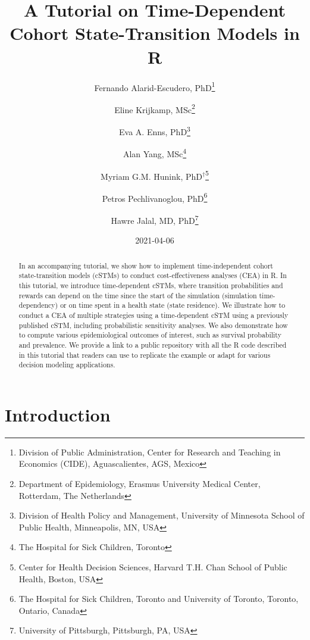 \documentclass[
]{article}
\title{A Tutorial on Time-Dependent Cohort State-Transition Models in R}
\author{Fernando Alarid-Escudero, PhD\footnote{Division of Public Administration, Center for Research and Teaching in Economics (CIDE), Aguascalientes, AGS, Mexico} \and Eline Krijkamp, MSc\footnote{Department of Epidemiology, Erasmus University Medical Center, Rotterdam, The Netherlands} \and Eva A. Enns, PhD\footnote{Division of Health Policy and Management, University of Minnesota School of Public Health, Minneapolis, MN, USA} \and Alan Yang, MSc\footnote{The Hospital for Sick Children, Toronto} \and Myriam G.M. Hunink, PhD\(^\dagger\)\footnote{Center for Health Decision Sciences, Harvard T.H. Chan School of Public Health, Boston, USA} \and Petros Pechlivanoglou, PhD\footnote{The Hospital for Sick Children, Toronto and University of Toronto, Toronto, Ontario, Canada} \and Hawre Jalal, MD, PhD\footnote{University of Pittsburgh, Pittsburgh, PA, USA}}
\date{2021-04-06}
\begin{document}
\maketitle
\begin{abstract}
In an accompanying tutorial, we show how to implement time-independent cohort state-transition models (cSTMs) to conduct cost-effectiveness analyses (CEA) in R. In this tutorial, we introduce time-dependent cSTMs, where transition probabilities and rewards can depend on the time since the start of the simulation (simulation time-dependency) or on time spent in a health state (state residence). We illustrate how to conduct a CEA of multiple strategies using a time-dependent cSTM using a previously published cSTM, including probabilistic sensitivity analyses. We also demonstrate how to compute various epidemiological outcomes of interest, such as survival probability and prevalence. We provide a link to a public repository with all the R code described in this tutorial that readers can use to replicate the example or adapt for various decision modeling applications.
\end{abstract}

{
\setcounter{tocdepth}{2}
\tableofcontents
}
\hypertarget{introduction}{%
\section{Introduction}\label{introduction}}
\end{document}
